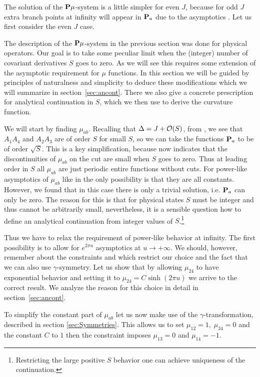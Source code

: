 The solution of the ${\bf P}\mu$-system is a little simpler for even $J$, because for odd $J$ extra branch points at infinity will appear in ${\bf P}_a$ due to the asymptotics . Let us first consider the even $J$ case.

The description of the ${\bf P}\mu$-system in the previous section was done for physical operators. Our goal is to take some peculiar limit
when the (integer) number of covariant derivatives
$S$ goes to zero.  As we will see this requires some extension of the asymptotic requirement for $\mu$ functions.
 In this section we will be guided by principles of naturalness and simplicity to deduce these modifications which
 we will summarize in section~\ref{sec:ancont}. There we also give a concrete prescription for analytical continuation in $S$, which we then use to derive the curvature function.

We will start by finding $\mu_{ab}$. Recalling that $\Delta=J+{\cal O}(S)$, from ,  we see that $A_1A_4$ and $A_2A_3$ are of order $S$ for small $S$, so we can take the functions ${\bf P}_a$ to be of order $\sqrt{S}$. This is a key simplification,
because now  indicates that the discontinuities of $\mu_{ab}$ on the cut are small when $S$ goes to zero. Thus at leading order in $S$ all $\mu_{ab}$ are just periodic entire functions without cuts.
For power-like asymptotics of $\mu_{ab}$ like in  the only possibility is that they are all constants.
However, we found that in this case there is only a trivial solution, i.e. ${\bf P}_a$ can only be zero.
The reason for this is that for physical states $S$ must be integer and thus cannot be arbitrarily small, nevertheless, it is a sensible
 question how to define an analytical continuation from integer values of $S$.\footnote{Restricting the large positive $S$ behavior
 one can achieve uniqueness of the continuation.}

Thus we have to relax the requirement of power-like behavior at infinity. The first possibility is
to allow for $e^{2\pi u}$ asymptotics at $u\to +\infty$.
We should, however, remember about the constraints  and  which restrict our choice and the fact that we can also use $\gamma$-symmetry.
Let us show that by allowing $\mu_{24}$ to have exponential behavior and setting it to
$\mu_{24}=C\sinh(2\pi u)$ we arrive to the correct result. We analyze the reason for this choice in detail in section~\ref{sec:ancont}.

To simplify the constant part of $\mu_{ab}$ let us now make use of the $\gamma$-transformation, described in section \ref{sec:Symmetries}.
This allows us to set $\mu_{12}=1,\;\mu_{34}=0$ and the constant $C$ to $1$ then the constraint
 imposes $\mu_{13}=0$ and $\mu_{14}=-1$.

